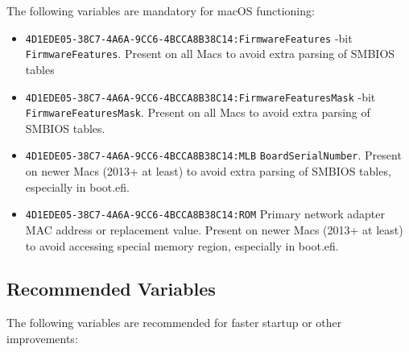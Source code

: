 \documentclass[]{article}
\providecommand{\tightlist}{%
  \setlength{\itemsep}{0pt}\setlength{\parskip}{0pt}}
\begin{document}
The following variables are mandatory for macOS functioning:

\begin{itemize}
\tightlist
\item
  \texttt{4D1EDE05-38C7-4A6A-9CC6-4BCCA8B38C14:FirmwareFeatures}
  -bit \texttt{FirmwareFeatures}. Present on all Macs to avoid extra parsing of SMBIOS tables
\item
  \texttt{4D1EDE05-38C7-4A6A-9CC6-4BCCA8B38C14:FirmwareFeaturesMask}
  -bit \texttt{FirmwareFeaturesMask}. Present on all Macs to avoid extra parsing
  of SMBIOS tables.
\item
  \texttt{4D1EDE05-38C7-4A6A-9CC6-4BCCA8B38C14:MLB}
  \break
  \texttt{BoardSerialNumber}. Present on newer Macs (2013+ at least) to avoid extra parsing
  of SMBIOS tables, especially in boot.efi.
\item
  \texttt{4D1EDE05-38C7-4A6A-9CC6-4BCCA8B38C14:ROM}
  \break
  Primary network adapter MAC address or replacement value. Present on newer Macs
  (2013+ at least) to avoid accessing special memory region, especially in boot.efi.
\end{itemize}

\subsection{Recommended Variables}\label{nvramvarsrec}

The following variables are recommended for faster startup or other
improvements:
\end{document}
